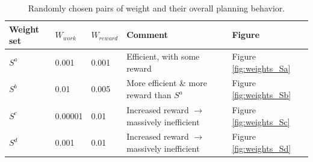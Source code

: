 \documentclass{tamuccthesis}
\begin{document}
\begin{table}[H]
    \begin{tabular}{|l|l|l|l|l|}
        \hline
        Weight set & $W_{work}$ & $W_{reward}$ & Comment & Figure \\
        \hline
        $S^a$ & 0.001 & 0.001 & Efficient, with some reward & Figure \ref{fig:weights_Sa} \\
        \hline
        $S^b$ & 0.01 & 0.005 & More efficient \& more reward than $S^a$ & Figure \ref{fig:weights_Sb} \\
        \hline
        $S^c$ & 0.00001 & 0.01 & Increased reward $\rightarrow$ massively inefficient & Figure \ref{fig:weights_Sc} \\
        \hline
        $S^d$ & 0.001 & 0.01 & Increased reward $\rightarrow$ massively inefficient & Figure \ref{fig:weights_Sd} \\
        \hline
    \end{tabular}
    \caption{Randomly chosen pairs of weight and their overall planning behavior.}
    \label{tbl:weight_sets}
\end{table}
\end{document}
